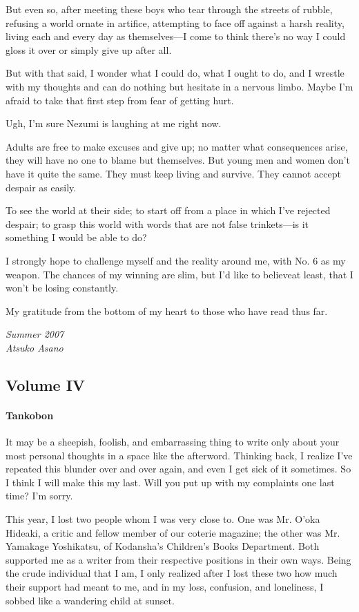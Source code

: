But even so, after meeting these boys who tear through the streets of
rubble, refusing a world ornate in artifice, attempting to face off
against a harsh reality, living each and every day as themselves---I come
to think there's no way I could gloss it over or simply give up after
all.

But with that said, I wonder what I could do, what I ought to do, and I
wrestle with my thoughts and can do nothing but hesitate in a nervous
limbo. Maybe I'm afraid to take that first step from fear of getting
hurt.

Ugh, I'm sure Nezumi is laughing at me right now.

Adults are free to make excuses and give up; no matter what consequences
arise, they will have no one to blame but themselves. But young men and
women don't have it quite the same. They must keep living and survive.
They cannot accept despair as easily.

To see the world at their side; to start off from a place in which I've
rejected despair; to grasp this world with words that are not false
trinkets---is it something I would be able to do?

I strongly hope to challenge myself and the reality around me, with No.
6 as my weapon. The chances of my winning are slim, but I'd like to
believe\el at least, that I won't be losing constantly.

My gratitude from the bottom of my heart to those who have read thus
far.

\myspace

\emph{Summer 2007\\
	Atsuko Asano}

\clearpage
\subsection{Volume IV}
\paragraph{Tankobon}

It may be a sheepish, foolish, and embarrassing thing to write only
about your most personal thoughts in a space like the afterword.
Thinking back, I realize I've repeated this blunder over and over again,
and even I get sick of it sometimes. So I think I will make this my
last. Will you put up with my complaints one last time? I'm sorry.

This year, I lost two people whom I was very close to. One was Mr. O'oka
Hideaki, a critic and fellow member of our coterie magazine; the other
was Mr. Yamakage Yoshikatsu, of Kodansha's Children's Books Department.
Both supported me as a writer from their respective positions in their
own ways. Being the crude individual that I am, I only realized after I
lost these two how much their support had meant to me, and in my loss,
confusion, and loneliness, I sobbed like a wandering child at sunset.


